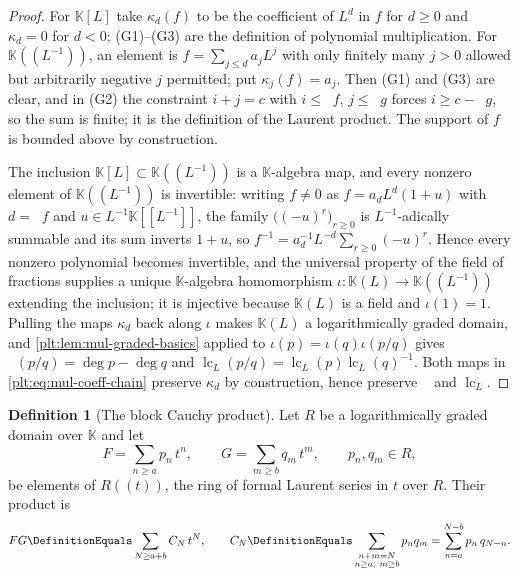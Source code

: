\documentclass[11pt,oneside]{article}
\theoremstyle{plain}
\theoremstyle{definition}
\newtheorem{definition}[theorem]{Definition}
\theoremstyle{remark}
\newcommand{\K}{\mathbb{K}}
\DeclareMathOperator{\lc}{lc}
\DeclareMathOperator{\degL}{deg_{L}}
\begin{document}
\begin{proof}
For $\K[L]$ take $\kappa_d(f)$ to be the coefficient of $L^d$ in $f$ for
$d\ge0$ and $\kappa_d=0$ for $d<0$; (G1)--(G3) are the definition of
polynomial multiplication.  For $\K((L^{-1}))$, an element is
$f=\sum_{j\le d}a_jL^j$ with only finitely many $j>0$ allowed but arbitrarily
negative $j$ permitted; put $\kappa_j(f)=a_j$.  Then (G1) and (G3) are clear,
and in (G2) the constraint $i+j=c$ with $i\le\degL f$, $j\le\degL g$ forces
$i\ge c-\degL g$, so the sum is finite; it is the definition of the Laurent
product.  The support of $f$ is bounded above by construction.

The inclusion $\K[L]\subset\K((L^{-1}))$ is a $\K$-algebra map, and every
nonzero element of $\K((L^{-1}))$ is invertible: writing $f\ne0$ as
$f=a_dL^d(1+u)$ with $d=\degL f$ and $u\in L^{-1}\K[[L^{-1}]]$, the family
$\bigl((-u)^r\bigr)_{r\ge0}$ is $L^{-1}$-adically summable and its sum
inverts $1+u$, so $f^{-1}=a_d^{-1}L^{-d}\sum_{r\ge0}(-u)^r$.  Hence
every nonzero polynomial becomes invertible, and the universal property of the
field of fractions supplies a unique $\K$-algebra homomorphism
$\iota\colon\K(L)\to\K((L^{-1}))$ extending the inclusion; it is injective
because $\K(L)$ is a field and $\iota(1)=1$.  Pulling the maps $\kappa_d$ back
along $\iota$ makes $\K(L)$ a logarithmically graded domain, and
\cref{plt:lem:mul-graded-basics} applied to $\iota(p)=\iota(q)\iota(p/q)$
gives $\degL(p/q)=\deg p-\deg q$ and
$\lc_L(p/q)=\lc_L(p)\lc_L(q)^{-1}$.  Both maps in
\eqref{plt:eq:mul-coeff-chain} preserve $\kappa_d$ by construction, hence
preserve $\degL$ and $\lc_L$.
\end{proof}

\begin{definition}[The block Cauchy product]
\label{plt:def:mul-cauchy}
Let $R$ be a logarithmically graded domain over $\K$ and let
\begin{equation}\label{plt:eq:mul-FG-blocks}
 F=\sum_{n\ge a}p_n\,t^n,
 \qquad
 G=\sum_{m\ge b}q_m\,t^m,
 \qquad p_n,q_m\in R,
\end{equation}
be elements of $R((t))$, the ring of formal Laurent series in $t$ over $R$.
Their product is
\begin{equation}\label{plt:eq:mul-cauchy}
 FG\DefinitionEquals\sum_{N\ge a+b}C_N\,t^N,
 \qquad
 C_N\DefinitionEquals\sum_{\substack{n+m=N\\ n\ge a,\ m\ge b}}p_nq_m
 =\sum_{n=a}^{N-b}p_n\,q_{N-n}.
\end{equation}
\end{definition}
\end{document}
